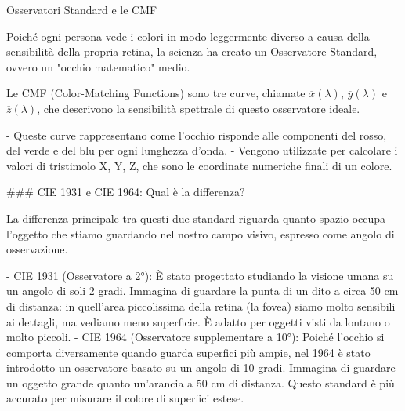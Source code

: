 Osservatori Standard e le CMF

Poiché ogni persona vede i colori in modo leggermente diverso a causa della sensibilità della propria retina, la scienza ha creato un Osservatore Standard, ovvero un "occhio matematico" medio.

Le CMF (Color-Matching Functions) sono tre curve, chiamate $\overline{x}(\lambda)$, $\overline{y}(\lambda)$ e $\overline{z}(\lambda)$, che descrivono la sensibilità spettrale di questo osservatore ideale.

- Queste curve rappresentano come l'occhio risponde alle componenti del rosso, del verde e del blu per ogni lunghezza d'onda.
- Vengono utilizzate per calcolare i valori di tristimolo X, Y, Z, che sono le coordinate numeriche finali di un colore.

### CIE 1931 e CIE 1964: Qual è la differenza?

La differenza principale tra questi due standard riguarda quanto spazio occupa l'oggetto che stiamo guardando nel nostro campo visivo, espresso come angolo di osservazione.

- CIE 1931 (Osservatore a 2°): È stato progettato studiando la visione umana su un angolo di soli 2 gradi. Immagina di guardare la punta di un dito a circa 50 cm di distanza: in quell'area piccolissima della retina (la fovea) siamo molto sensibili ai dettagli, ma vediamo meno superficie. È adatto per oggetti visti da lontano o molto piccoli.
- CIE 1964 (Osservatore supplementare a 10°): Poiché l'occhio si comporta diversamente quando guarda superfici più ampie, nel 1964 è stato introdotto un osservatore basato su un angolo di 10 gradi. Immagina di guardare un oggetto grande quanto un'arancia a 50 cm di distanza. Questo standard è più accurato per misurare il colore di superfici estese.